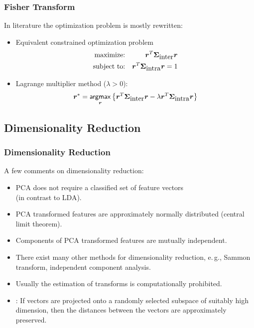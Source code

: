 \begin{frame}
	\frametitle{Fisher Transform \cont}

	In literature the optimization problem is mostly rewritten:
	\spread

	\begin{itemize}
		\item Equivalent constrained optimization problem
		      \begin{eqnarray*}
			      \mbox{maximize:}   & & {\bm r}^T {\bm \Sigma}_{\mbox{inter}}{\bm r}\\
			      \mbox{subject to:} & & {\bm r}^T {\bm \Sigma}_{\mbox{intra}} {\bm r} =1
		      \end{eqnarray*}
		      \spread
		\item Lagrange multiplier method ($\lambda>0$):
		      \begin{displaymath}
			      {\bm r}^* = \mathop{\mathsf{argmax}}_{{\bm r}}
			      \left\{
			      {\bm r}^T {\bm \Sigma}_{\mbox{inter}} {\bm r}
			      - \lambda{\ensuremath{{\bm r}}^T \ensuremath{{\bm \Sigma}}_{\mbox{intra}} \ensuremath{{\bm r}}}
			      \right\}
		      \end{displaymath}
	\end{itemize}
\end{frame}


\subsection{Dimensionality Reduction}

\begin{frame}

	\frametitle{Dimensionality Reduction}

	A few comments on dimensionality reduction:

	\begin{itemize}
		\item PCA does not require a classified set of feature vectors \\
		      (in contrast to LDA). \\[.15cm]
		\item PCA transformed features are approximately normally distributed (central limit theorem). \\[.15cm]
		\item Components of PCA transformed features are mutually independent. \\[.15cm]
		\item There exist many other methods for dimensionality reduction, e.\,g.,
		      Sammon transform, independent component analysis. \\[.15cm]
		\item Usually the estimation of transforms is computationally prohibited. \\[.15cm]
		\item {}: If vectors are projected onto a randomly selected subspace of suitably high dimension, then the distances between the vectors are approximately preserved.
	\end{itemize}
\end{frame}

